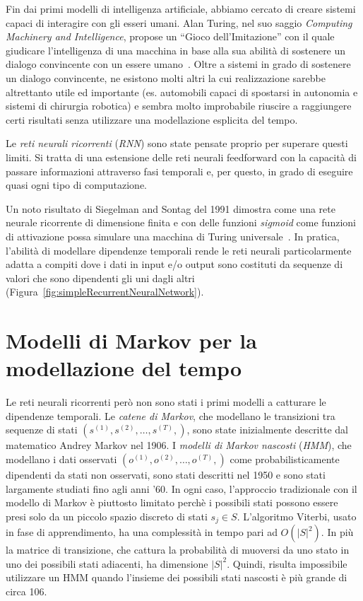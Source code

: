 Fin dai primi modelli di intelligenza artificiale, abbiamo cercato di creare
sistemi capaci di interagire con gli esseri umani. Alan Turing, nel suo saggio
\emph{Computing Machinery and Intelligence}, propose un ``Gioco dell'Imitazione''
con il quale giudicare l'intelligenza di una macchina in base alla sua abilit\`a
di sostenere un dialogo convincente con un essere umano~\cite{Turing:1950}.
Oltre a sistemi in grado di sostenere un dialogo convincente, ne esistono molti
altri la cui realizzazione sarebbe altrettanto utile ed importante (es. automobili
capaci di spostarsi in autonomia e sistemi di chirurgia robotica) e sembra molto
improbabile riuscire a raggiungere certi risultati senza utilizzare una modellazione
esplicita del tempo.

Le \emph{reti neurali ricorrenti} (\emph{RNN}) sono state pensate proprio per
superare questi limiti. Si tratta di una estensione delle reti neurali feedforward
con la capacit\`a di passare informazioni attraverso fasi temporali e, per questo,
in grado di eseguire quasi ogni tipo di computazione.

Un noto risultato di Siegelman and Sontag del 1991 dimostra come una rete neurale
ricorrente di dimensione finita e con delle funzioni \textit{sigmoid} come funzioni
di attivazione possa simulare una macchina di Turing universale~\cite{Siegelmann:1991}.
In pratica, l'abilit\`a di modellare dipendenze temporali rende le reti neurali
particolarmente adatta a compiti dove i dati in input e/o output sono costituti
da sequenze di valori che sono dipendenti gli uni dagli altri (Figura~\ref{fig:simpleRecurrentNeuralNetwork}).

\section{Modelli di Markov per la modellazione del tempo}

Le reti neurali ricorrenti per\`o non sono stati i primi modelli a catturare le
dipendenze temporali. Le \emph{catene di Markov}, che modellano le transizioni
tra sequenze di stati $(s^{(1)}, s^{(2)}, \dots, s^{(T)},)$, sono state inizialmente
descritte dal matematico Andrey Markov nel 1906. I \emph{modelli di Markov nascosti}
(\emph{HMM}), che modellano i dati osservati $(o^{(1)}, o^{(2)}, \dots, o^{(T)},)$
come probabilisticamente dipendenti da stati non osservati, sono stati descritti
nel 1950 e sono stati largamente studiati fino agli anni '60.
In ogni caso, l'approccio tradizionale con il modello di Markov \`e piuttosto
limitato perch\`e i possibili stati possono essere presi solo da un piccolo spazio
discreto di stati $ s_j \in S$. L'algoritmo Viterbi, usato in fase di apprendimento,
ha una complessit\`a in tempo pari ad $O(|S|^2)$. In pi\`u la matrice di transizione,
che cattura la probabilit\`a di muoversi da uno stato in uno dei possibili stati
adiacenti, ha dimensione $|S|^2$. Quindi, risulta impossibile utilizzare un HMM
quando l'insieme dei possibili stati nascosti \`e pi\`u grande di circa 106.


